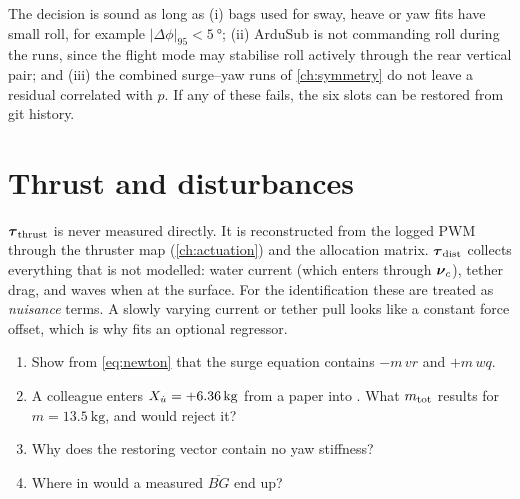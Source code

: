 \begin{caution}
The decision is sound as long as (i) bags used for sway, heave or yaw fits have small roll, for
example $|\Delta\phi|_{95} < \qty{5}{\degree}$; (ii) ArduSub is not commanding roll during the
runs, since the flight mode may stabilise roll actively through the rear vertical pair; and
(iii) the combined surge--yaw runs of \cref{ch:symmetry} do not leave a residual correlated with
$p$. If any of these fails, the six slots can be restored from git history.
\end{caution}

\section{Thrust and disturbances}

$\boldsymbol{\tau}_\mathrm{thrust}$ is never measured directly. It is reconstructed from the
logged PWM through the thruster map (\cref{ch:actuation}) and the allocation matrix.
$\boldsymbol{\tau}_\mathrm{dist}$ collects everything that is not modelled: water current (which
enters through $\boldsymbol{\nu}_c$), tether drag, and waves when at the surface. For the
identification these are treated as \emph{nuisance} terms. A slowly varying current or
tether pull looks like a constant force offset, which is why  fits
an optional  regressor.

\begin{questions}
\begin{enumerate}
  \item Show from \eqref{eq:newton} that the surge equation contains $-m\,vr$ and $+m\,wq$.
  \item A colleague enters $X_{\dot u} = +\qty{6.36}{\kilogram}$ from a paper into .
        What $m_\mathrm{tot}$ results for $m = \qty{13.5}{\kilogram}$, and would
         reject it?
  \item Why does the restoring vector contain no yaw stiffness?
  \item Where in  would a measured $\overline{BG}$ end up?
\end{enumerate}
\end{questions}
